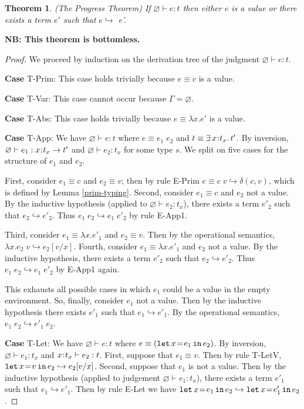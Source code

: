 \documentclass[11pt]{article}
\newtheorem{theorem}{Theorem}%
\newcommand{\bind}{\hspace{0.05em}{:}\hspace{0.05em}} %
\newcommand{\step}{\hookrightarrow}
\newcommand{\existype}[3]{\exists\, #1\bind #2.\, #3}
\newcommand{\functype}[3]{#1\bind #2 \rightarrow #3}
\newcommand{\letin}[3]{{\tt let}\,#1\hspace{0.1em}{=}\hspace{0.1em}#2\,{\tt in}\,#3}
\begin{document}
\begin{theorem}\label{progress}
(The Progress Theorem) If $\varnothing \vdash e : t$ then either $e$ is a value or there exists a term $e'$ such that $e \hookrightarrow$ e'.
\end{theorem} {\bf NB: This theorem is bottomless.}

\begin{proof} We proceed by induction on the derivation tree of the judgment $\varnothing \vdash e : t$.

{\bf Case} {\sc T-Prim}: This case holds trivially because $e \equiv c$ is a value.

{\bf Case} {\sc T-Var}: This case cannot occur because $\Gamma = \varnothing$.

{\bf Case} {\sc T-Abs}: This case holds trivially because $e \equiv \lambda x.e'$ is a value.

{\bf Case} {\sc T-App}: We have $\varnothing \vdash e : t$ where $e \equiv e_1\; e_2$ and $t \equiv \existype{x}{t_x}{t'}$. By inversion, $\varnothing \vdash e_1 : \functype{x}{t_x}{t'}$ and $\varnothing \vdash e_2 : t_x$ for some type $s$. We split on five cases for the structure of $e_1$ and $e_2$.

First, consider $e_1 \equiv c$ and $e_2 \equiv v$; then by rule {\sc E-Prim} $e \equiv c\; v \hookrightarrow \delta(c,v)$, which is defined by Lemma \ref{prim-typing}.
Second, consider $e_1 \equiv c$ and $e_2$ not a value. By the inductive hypothesis (applied to $\varnothing \vdash e_2 : t_x$), there exists a term $e'_2$ such that $e_2 \step e'_2$. Thus $e_1\; e_2 \step e_1 \; e'_2$ by rule {\sc E-App1}.

Third, consider $e_1 \equiv \lambda x.e'_1$ and $e_2 \equiv v$. Then by the operational semantics, $\lambda x.e_2 \; v \step e_2[v/x]$. Fourth, consider $e_1 \equiv \lambda x.e'_1$ and $e_2$ not a value. By the inductive hypothesis, there exists a term $e'_2$ such that $e_2 \step e'_2$. Thus $e_1\; e_2 \step e_1 \; e'_2$ by {\sc E-App1} again.

This exhausts all possible cases in which $e_1$ could be a value in the empty environment. So, finally, consider $e_1$ not a value. Then by the inductive hypothesis there exists $e'_1$ such that $e_1 \hookrightarrow e'_1$. By the operational semantics, $e_1\; e_2 \hookrightarrow e'_1\; e_2$.

{\bf Case} {\sc T-Let}: We have $\varnothing \vdash e : t$ where
$e \equiv (\letin{x}{e_1}{e_2})$. By inversion, $\varnothing \vdash e_1:t_x$ and $x\bind t_x\vdash e_2: t$. First, suppose that $e_1 \equiv v$. Then by rule {\sc T-LetV}, $\letin{x}{v}{e_2} \step e_2[v/x]$. Second, suppose that $e_1$ is not a value. Then by the inductive hypothesis (applied to judgement $\varnothing \vdash e_1:t_x$), there exists a term $e'_1$ such that $e_1 \step e'_1$. Then by rule {\sc E-Let} we have $\letin{x}{e_1}{e_2} \step \letin{x}{e'_1}{e_2}$.


\end{proof}
\end{document}

